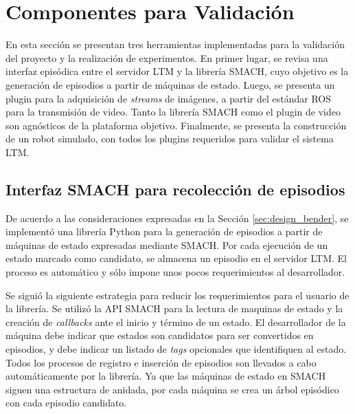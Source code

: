 
\section{Componentes para Validación}\label{sec:impl-validation}

En esta sección se presentan tres herramientas implementadas para la validación del proyecto y la realización de experimentos. En primer lugar, se revisa una interfaz episódica entre el servidor LTM y la librería SMACH, cuyo objetivo es la generación de episodios a partir de máquinas de estado. Luego, se presenta un plugin para la adquisición de \textit{streams} de imágenes, a partir del estándar ROS para la transmisión de video. Tanto la librería SMACH como el plugin de video son agnósticos de la plataforma objetivo. Finalmente, se presenta la construcción de un robot simulado, con todos los plugins requeridos para validar el sistema LTM. 

\subsection{Interfaz SMACH para recolección de episodios}

De acuerdo a las consideraciones expresadas en la Sección \ref{sec:design_bender}, se implementó una librería Python para la generación de episodios a partir de máquinas de estado expresadas mediante SMACH. Por cada ejecución de un estado marcado como candidato, se almacena un episodio en el servidor LTM. El proceso es automático y sólo impone unos pocos requerimientos al desarrollador.

 Se siguió la siguiente estrategia para reducir los requerimientos para el usuario de la librería. Se utilizó la API SMACH para la lectura de maquinas de estado y la creación de \textit{callbacks} ante el inicio y término de un estado. El desarrollador de la máquina debe indicar que estados son candidatos para ser convertidos en episodios, y debe indicar un listado de \textit{tags} opcionales que identifiquen al estado. Todos los procesos de registro e inserción de episodios son llevados a cabo automáticamente por la librería. Ya que las máquinas de estado en SMACH siguen una estructura de anidada, por cada máquina se crea un árbol episódico con cada episodio candidato.

